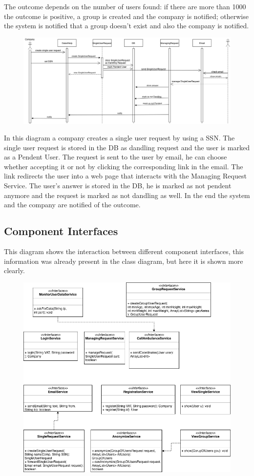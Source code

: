 \documentclass{article}
\begin{document}
The outcome depends on the number of users found: if there are more than 1000 the outcome is positive, a group is created and the company is notified; otherwise the system is notified that a group doesn't exist and also the company is notified.
\newpage
\begin{figure}[h!]
\centering
    \textbf{}\par\medskip
	\includegraphics[width= \linewidth]{singlerequest.png}
\end{figure}
In this diagram a company creates a single user request by using a SSN.  The single user request is stored in the DB as dandling request and the user is marked as a Pendent User. The request is sent to the user by email, he can choose whether accepting it or not by clicking the corresponding link in the email. The link redirects the user into a web page that interacts with the Managing Request Service. The user's answer is stored in the DB, he is marked as not pendent anymore and the request is marked as not dandling as well. In the end the system and the company are notified of the outcome.
\newpage
\subsection{Component Interfaces}
This diagram shows the interaction between different component interfaces, this information was already present in the class diagram, but here it is shown more clearly.
\begin{figure}[h!]
\centering
    \textbf{}\par\medskip
	\includegraphics[width= \linewidth]{inter.png}
\end{figure}
\newpage
\end{document}
